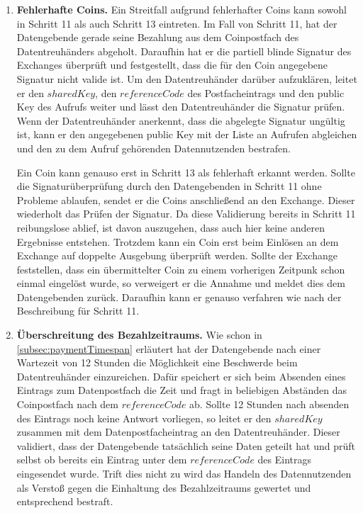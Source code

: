 \documentclass[11pt,a4paper]{scrreprt}
\begin{document}
\begin{enumerate}
    \item \textbf{Fehlerhafte Coins.}\label{case:IncorrectCoins}
    Ein Streitfall aufgrund fehlerhafter Coins kann sowohl in Schritt 11 als auch Schritt 13 eintreten. Im Fall von Schritt 11, hat der Datengebende gerade seine Bezahlung aus dem Coinpostfach des Datentreuhänders abgeholt. Daraufhin hat er die partiell blinde Signatur des Exchanges überprüft und festgestellt, dass die für den Coin angegebene Signatur nicht valide ist. Um den Datentreuhänder darüber aufzuklären, leitet er den $sharedKey$, den $referenceCode$ des Postfacheintrags und den public Key des Aufrufs weiter und lässt den Datentreuhänder die Signatur prüfen. Wenn der Datentreuhänder anerkennt, dass die abgelegte Signatur ungültig ist, kann er den angegebenen public Key mit der Liste an Aufrufen abgleichen und den zu dem Aufruf gehörenden Datennutzenden bestrafen.
    
    Ein Coin kann genauso erst in Schritt 13 als fehlerhaft erkannt werden. Sollte die Signaturüberprüfung durch den Datengebenden in Schritt 11 ohne Probleme ablaufen, sendet er die Coins anschließend an den Exchange. Dieser wiederholt das Prüfen der Signatur. Da diese Validierung bereits in Schritt 11 reibungslose ablief, ist davon auszugehen, dass auch hier keine anderen Ergebnisse entstehen. Trotzdem kann ein Coin erst beim Einlösen an dem Exchange auf doppelte Ausgebung überprüft werden. Sollte der Exchange feststellen, dass ein übermittelter Coin zu einem vorherigen Zeitpunk schon einmal eingelöst wurde, so verweigert er die Annahme und meldet dies dem Datengebenden zurück. Daraufhin kann er genauso verfahren wie nach der Beschreibung für Schritt 11.

    \item \textbf{Überschreitung des Bezahlzeitraums.} \label{case:paymentExceeded}
    Wie schon in \ref{subsec:paymentTimespan} erläutert hat der Datengebende nach einer Wartezeit von 12 Stunden die Möglichkeit eine Beschwerde beim Datentreuhänder einzureichen. Dafür speichert er sich beim Absenden eines Eintrags zum Datenpostfach die Zeit und fragt in beliebigen Abständen das Coinpostfach nach dem $referenceCode$ ab. Sollte 12 Stunden nach absenden des Eintrags noch keine Antwort vorliegen, so leitet er den $sharedKey$ zusammen mit dem Datenpostfacheintrag an den Datentreuhänder. Dieser validiert, dass der Datengebende tatsächlich seine Daten geteilt hat und prüft selbst ob bereits ein Eintrag unter dem $referenceCode$ des Eintrags eingesendet wurde. Trift dies nicht zu wird das Handeln des Datennutzenden als Verstoß gegen die Einhaltung des Bezahlzeitraums gewertet und entsprechend bestraft.
\end{enumerate}
\end{document}

